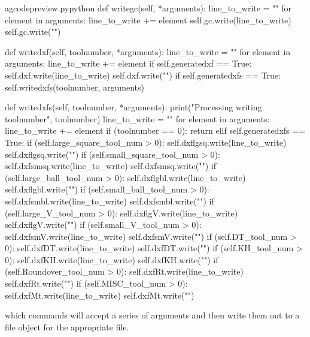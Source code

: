 \documentclass{ltxdoc}
\begin{document}
\lstset{firstnumber=\thegcpy}
\begin{writecode}{a}{gcodepreview.py}{python}
    def writegc(self, *arguments):
        line_to_write = ""
        for element in arguments:
            line_to_write += element
        self.gc.write(line_to_write)
        self.gc.write("\n")

    def writedxf(self, toolnumber, *arguments):
        line_to_write = ""
        for element in arguments:
            line_to_write += element
        if self.generatedxf == True:
            self.dxf.write(line_to_write)
            self.dxf.write("\n")
        if self.generatedxfs == True:
            self.writedxfs(toolnumber, arguments)

    def writedxfs(self, toolnumber, *arguments):
        print("Processing writing toolnumber", toolnumber)
        line_to_write = ""
        for element in arguments:
            line_to_write += element
        if (toolnumber == 0):
            return
        elif self.generatedxfs == True:
            if (self.large_square_tool_num > 0):
                self.dxflgsq.write(line_to_write)
                self.dxflgsq.write("\n")
            if (self.small_square_tool_num > 0):
                self.dxfsmsq.write(line_to_write)
                self.dxfsmsq.write("\n")
            if (self.large_ball_tool_num > 0):
                self.dxflgbl.write(line_to_write)
                self.dxflgbl.write("\n")
            if (self.small_ball_tool_num > 0):
                self.dxfsmbl.write(line_to_write)
                self.dxfsmbl.write("\n")
            if (self.large_V_tool_num > 0):
                self.dxflgV.write(line_to_write)
                self.dxflgV.write("\n")
            if (self.small_V_tool_num > 0):
                self.dxfsmV.write(line_to_write)
                self.dxfsmV.write("\n")
            if (self.DT_tool_num > 0):
                self.dxfDT.write(line_to_write)
                self.dxfDT.write("\n")
            if (self.KH_tool_num > 0):
                self.dxfKH.write(line_to_write)
                self.dxfKH.write("\n")
            if (self.Roundover_tool_num > 0):
                self.dxfRt.write(line_to_write)
                self.dxfRt.write("\n")
            if (self.MISC_tool_num > 0):
                self.dxfMt.write(line_to_write)
                self.dxfMt.write("\n")

\end{writecode}
\addtocounter{gcpy}{56}

\noindent which commands will accept a series of arguments and then write them out to a file object for the appropriate file.
\end{document}
